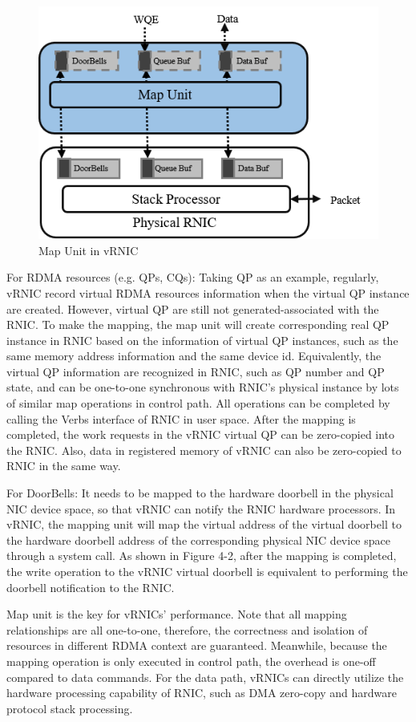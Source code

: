 \begin{figure}[!ht]
	\centering
	\includegraphics[width=0.9\linewidth]{images/map-unit}
	\caption{Map Unit in vRNIC}
	\label{fig:map-unit}
\end{figure}

For RDMA resources (e.g. QPs, CQs): Taking QP as an example, regularly, vRNIC record virtual RDMA resources information when the virtual QP instance are created. However, virtual QP are still not generated-associated with the RNIC. To make the mapping, the map unit will create corresponding real QP instance in RNIC based on the information of virtual QP instances, such as the same memory address information and the same device id. Equivalently, the virtual QP information are recognized in RNIC, such as QP number and QP state, and can be one-to-one synchronous with RNIC’s physical instance by lots of similar map operations in control path. All operations can be completed by calling the Verbs interface of RNIC in user space. After the mapping is completed, the work requests in the vRNIC virtual QP can be zero-copied into the RNIC. Also, data in registered memory of vRNIC can also be zero-copied to RNIC in the same way. 

For DoorBells: It needs to be mapped to the hardware doorbell in the physical NIC device space, so that vRNIC can notify the RNIC hardware processors. In vRNIC, the mapping unit will map the virtual address of the virtual doorbell to the hardware doorbell address of the corresponding physical NIC device space through a system call. As shown in Figure 4-2, after the mapping is completed, the write operation to the vRNIC virtual doorbell is equivalent to performing the doorbell notification to the RNIC.

Map unit is the key for vRNICs' performance. Note that all mapping relationships are all one-to-one, therefore, the correctness and isolation of resources in different RDMA context are guaranteed. Meanwhile, because the mapping operation is only executed in control path, the overhead is one-off compared to data commands. For the data path, vRNICs can directly utilize the hardware processing capability of RNIC, such as DMA zero-copy and hardware protocol stack processing.

